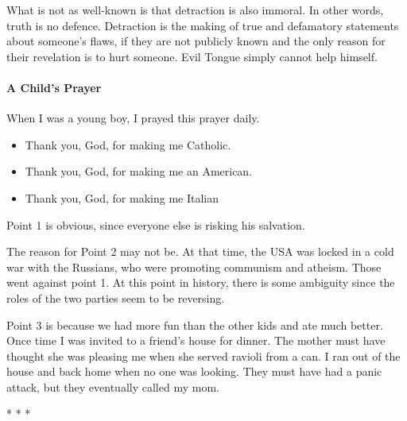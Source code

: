 What is not as well-known is that detraction is also immoral. In other words, truth is no defence. Detraction is the making of true and defamatory statements about someone's flaws, if they are not publicly known and the only reason for their revelation is to hurt someone. Evil Tongue simply cannot help himself.

\paragraph{A Child's Prayer}


When I was a young boy, I prayed this prayer daily.

\begin{itemize}


\item Thank you, God, for making me Catholic.

\item Thank you, God, for making me an American.

\item Thank you, God, for making me Italian
\end{itemize}


Point 1 is obvious, since everyone else is risking his salvation.

The reason for Point 2 may not be. At that time, the USA was locked in a cold war with the Russians, who were promoting communism and atheism. Those went against point 1. At this point in history, there is some ambiguity since the roles of the two parties seem to be reversing.

Point 3 is because we had more fun than the other kids and ate much better. Once time I was invited to a friend's house for dinner. The mother must have thought she was pleasing me when she served ravioli from a can. I ran out of the house and back home when no one was looking. They must have had a panic attack, but they eventually called my mom.



\begin{center}* * *\end{center}

